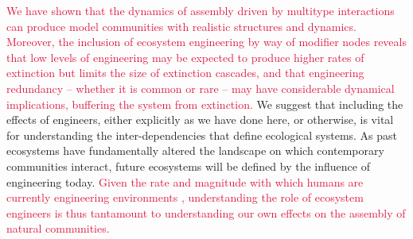 \documentclass[twocolumn,preprintnumbers,amsmath,amssymb,superscriptaddress,linenumbers]{revtex4-1}
\newcommand{\rev}[1]{\textcolor{crimson}{#1}}
\begin{document}
\rev{We have shown that the dynamics of assembly driven by multitype interactions can produce model communities with realistic structures and dynamics. 
Moreover, the inclusion of ecosystem engineering by way of modifier nodes reveals that low levels of engineering may be expected to produce higher rates of extinction but limits the size of extinction cascades, and that engineering redundancy -- whether it is common or rare -- may have considerable dynamical implications, buffering the system from extinction.}
We suggest that including the effects of engineers, either explicitly as we have done here, or otherwise, is vital for understanding the inter-dependencies that define ecological systems.
As past ecosystems have fundamentally altered the landscape on which contemporary communities interact, future ecosystems will be defined by the influence of engineering today.
\rev{Given the rate and magnitude with which humans are currently engineering environments \cite{Corlett2015}, understanding the role of ecosystem engineers is thus tantamount to understanding our own effects on the assembly of natural communities.}\\



\end{document}
